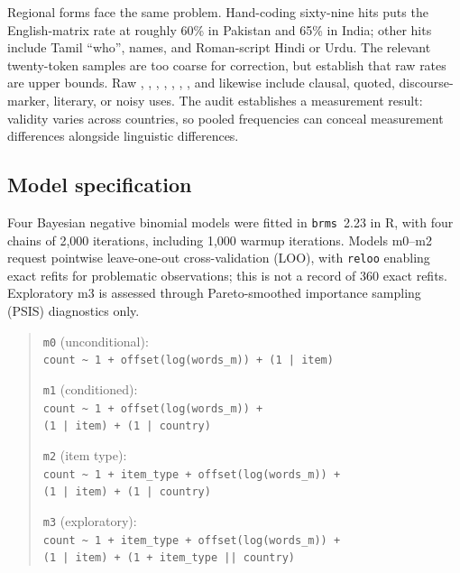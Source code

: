 \documentclass[12pt]{article}
\begin{document}
Regional forms face the same problem. Hand-coding sixty-nine  hits puts the English-matrix rate at roughly 60\% in Pakistan and 65\% in India; other hits include Tamil  \enquote{who}, names, and Roman-script Hindi or Urdu. The relevant twenty-token samples are too coarse for correction, but establish that raw rates are upper bounds. Raw , , , , , , , and  likewise include clausal, quoted, discourse-marker, literary, or noisy uses. The audit establishes a measurement result: validity varies across countries, so pooled frequencies can conceal measurement differences alongside linguistic differences.

\subsection{Model specification}

Four Bayesian negative binomial models were fitted in \texttt{brms}~2.23 in R, with four chains of 2,000 iterations, including 1,000 warmup iterations. Models m0--m2 request pointwise leave-one-out cross-validation (LOO), with \texttt{reloo} enabling exact refits for problematic observations; this is not a record of 360 exact refits. Exploratory m3 is assessed through Pareto-smoothed importance sampling (PSIS) diagnostics only.

\begin{quote}
\small \noindent\texttt{m0} (unconditional):\\ \texttt{count \textasciitilde{} 1 + offset(log(words\_m)) + (1~|~item)}

\noindent\parbox{\linewidth}{\texttt{m1} (conditioned):\\ \texttt{count \textasciitilde{} 1 + offset(log(words\_m)) +}\\ \texttt{(1~|~item) + (1~|~country)}}

\noindent\parbox{\linewidth}{\texttt{m2} (item type):\\ \texttt{count \textasciitilde{} 1 + item\_type + offset(log(words\_m)) +}\\ \texttt{(1~|~item) + (1~|~country)}}

\noindent\parbox{\linewidth}{\texttt{m3} (exploratory):\\ \texttt{count \textasciitilde{} 1 + item\_type + offset(log(words\_m)) +}\\ \texttt{(1~|~item) + (1~+~item\_type~||~country)}}
\end{quote}
\end{document}
